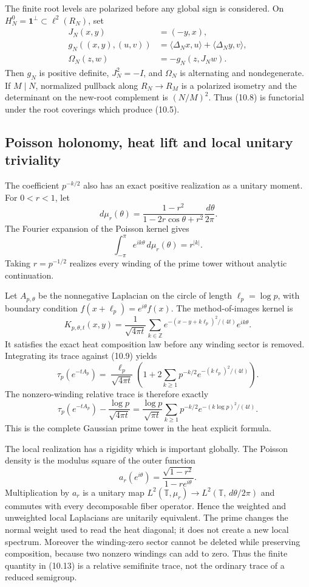 \documentclass[11pt]{amsart}
\theoremstyle{definition}
\theoremstyle{remark}
\newcommand{\dd}{\,d}
\begin{document}
The finite root levels are polarized before any global sign is considered.
On \(H_N^0=\mathbf1^\perp\subset\ell^2(R_N)\), set
\[
 \begin{aligned}
 J_N(x,y)&=(-y,x),\\
 g_N((x,y),(u,v))
 &=\langle\Delta_Nx,u\rangle+\langle\Delta_Ny,v\rangle,\\
 \Omega_N(z,w)&=-g_N(z,J_Nw).
 \end{aligned}
 \tag{10.8}
\]
Then \(g_N\) is positive definite, \(J_N^2=-I\), and \(\Omega_N\) is
alternating and nondegenerate.  If \(M\mid N\), normalized pullback along
\(R_N\to R_M\) is a polarized isometry and the determinant on the new-root
complement is \((N/M)^2\).  Thus (10.8) is functorial under the root
coverings which produce (10.5).

\subsection{Poisson holonomy, heat lift and local unitary triviality}

The coefficient \(p^{-k/2}\) also has an exact positive realization as a
unitary moment.  For \(0<r<1\), let
\[
 \dd\mu_r(\theta)
 =\frac{1-r^2}{1-2r\cos\theta+r^2}\frac{\dd\theta}{2\pi}.
\tag{10.8a}
\]
The Fourier expansion of the Poisson kernel gives
\[
 \int_{-\pi}^{\pi}e^{ik\theta}\dd\mu_r(\theta)=r^{|k|}.
\tag{10.8b}
\]
Taking \(r=p^{-1/2}\) realizes every winding of the prime tower without
analytic continuation.

Let \(A_{p,\theta}\) be the nonnegative Laplacian on the circle of length
\(\ell_p=\log p\), with boundary condition
\(f(x+\ell_p)=e^{i\theta}f(x)\).  The method-of-images kernel is
\[
 K_{p,\theta,t}(x,y)
 =\frac1{\sqrt{4\pi t}}
  \sum_{k\in\mathbb Z}
  e^{-(x-y+k\ell_p)^2/(4t)}e^{ik\theta}.
\tag{10.8c}
\]
It satisfies the exact heat composition law before any winding sector is
removed.  Integrating its trace against (10.9) yields
\[
 \boxed{
 \tau_p(e^{-tA_p})
 =\frac{\ell_p}{\sqrt{4\pi t}}
  \left(1+2\sum_{k\ge1}p^{-k/2}
  e^{-(k\ell_p)^2/(4t)}\right).}
\tag{10.8d}
\]
The nonzero-winding relative trace is therefore exactly
\[
 \tau_p(e^{-tA_p})-\frac{\log p}{\sqrt{4\pi t}}
 =\frac{\log p}{\sqrt{\pi t}}
  \sum_{k\ge1}p^{-k/2}e^{-(k\log p)^2/(4t)}.
\tag{10.8e}
\]
This is the complete Gaussian prime tower in the heat explicit formula.

The local realization has a rigidity which is important globally.  The
Poisson density is the modulus square of the outer function
\[
 a_r(e^{i\theta})=\frac{\sqrt{1-r^2}}{1-re^{i\theta}}.
\tag{10.8f}
\]
Multiplication by \(a_r\) is a unitary map
\(L^2(\mathbb T,\mu_r)\to L^2(\mathbb T,\dd\theta/2\pi)\) and commutes
with every decomposable fiber operator.  Hence the weighted and unweighted
local Laplacians are unitarily equivalent.  The prime changes the normal
weight used to read the heat diagonal; it does not create a new local
spectrum.  Moreover the winding-zero sector cannot be deleted while
preserving composition, because two nonzero windings can add to zero.
Thus the finite quantity in (10.13) is a relative semifinite trace, not the
ordinary trace of a reduced semigroup.
\end{document}
